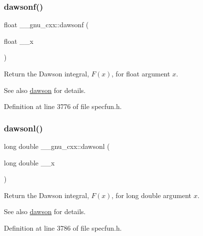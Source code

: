 \subsubsection{\texorpdfstring{dawsonf()}{dawsonf()}}
{\footnotesize\ttfamily float \+\_\+\+\_\+gnu\+\_\+cxx\+::dawsonf (\begin{DoxyParamCaption}\item[{float}]{\+\_\+\+\_\+x }\end{DoxyParamCaption})\hspace{0.3cm}{\ttfamily [inline]}}

Return the Dawson integral, $ F(x) $, for {\ttfamily float} argument $ x $.

\begin{DoxySeeAlso}{See also}
\hyperlink{group__gnu__math__spec__func_gabc97cbc04fdd23593e8dccbc1421dad5}{dawson} for details. 
\end{DoxySeeAlso}


Definition at line 3776 of file specfun.\+h.

\mbox{\label{group__gnu__math__spec__func_ga6647a7444ff9c7c1f2a8ed36761bfeb2}} 
\subsubsection{\texorpdfstring{dawsonl()}{dawsonl()}}
{\footnotesize\ttfamily long double \+\_\+\+\_\+gnu\+\_\+cxx\+::dawsonl (\begin{DoxyParamCaption}\item[{long double}]{\+\_\+\+\_\+x }\end{DoxyParamCaption})\hspace{0.3cm}{\ttfamily [inline]}}

Return the Dawson integral, $ F(x) $, for {\ttfamily long double} argument $ x $.

\begin{DoxySeeAlso}{See also}
\hyperlink{group__gnu__math__spec__func_gabc97cbc04fdd23593e8dccbc1421dad5}{dawson} for details. 
\end{DoxySeeAlso}


Definition at line 3786 of file specfun.\+h.

\mbox{\label{group__gnu__math__spec__func_ga0b14de47c011de3ebf771c9f29b2b78c}} 

